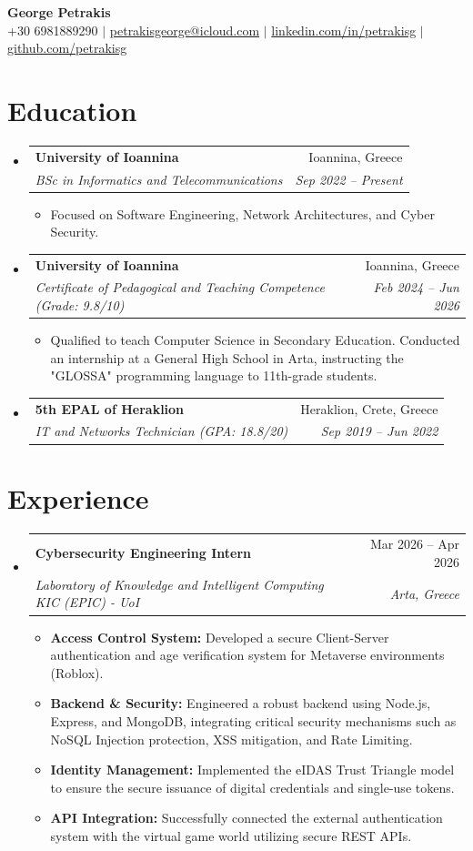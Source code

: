 \documentclass[letterpaper,11pt]{article}
\makeatletter
\newcommand{\resumeItem}[1]{
  \item\small{
    {#1 \vspace{-2pt}}
  }
}
\newcommand{\resumeSubheading}[4]{
  \vspace{-2pt}\item
    \begin{tabular*}{0.97\textwidth}[t]{l@{\extracolsep{\fill}}r}
      \textbf{#1} & #2 \\
      \textit{\small#3} & \textit{\small #4} \\
    \end{tabular*}\vspace{-7pt}
}
\newcommand{\resumeSubHeadingListStart}{\begin{itemize}[leftmargin=0.15in, label={}]}
\newcommand{\resumeSubHeadingListEnd}{\end{itemize}}
\newcommand{\resumeItemListStart}{\begin{itemize}}
\newcommand{\resumeItemListEnd}{\end{itemize}\vspace{-7pt}}
\makeatother
\begin{document}
\begin{center}
    {\Huge \textbf{George Petrakis}} \\ \vspace{2pt}
    \small +30 6981889290 $|$ \href{mailto:petrakisgeorge@icloud.com}{petrakisgeorge@icloud.com} $|$ \href{https://linkedin.com/in/petrakisg}{linkedin.com/in/petrakisg} $|$ \href{https://github.com/petrakisg}{github.com/petrakisg} \\
\end{center}

\section{Education}
  \resumeSubHeadingListStart
    \resumeSubheading
      {University of Ioannina}{Ioannina, Greece}
      {BSc in Informatics and Telecommunications}{Sep 2022 -- Present}
      \resumeItemListStart
        \resumeItem{Focused on Software Engineering, Network Architectures, and Cyber Security.}
      \resumeItemListEnd
    \resumeSubheading
      {University of Ioannina}{Ioannina, Greece}
      {Certificate of Pedagogical and Teaching Competence (Grade: 9.8/10)}{Feb 2024 -- Jun 2026}
      \resumeItemListStart
        \resumeItem{Qualified to teach Computer Science in Secondary Education. Conducted an internship at a General High School in Arta, instructing the "GLOSSA" programming language to 11th-grade students.}
      \resumeItemListEnd
    \resumeSubheading
      {5th EPAL of Heraklion}{Heraklion, Crete, Greece}
      {IT and Networks Technician (GPA: 18.8/20)}{Sep 2019 -- Jun 2022}
  \resumeSubHeadingListEnd

\section{Experience}
  \resumeSubHeadingListStart
    \resumeSubheading
      {Cybersecurity Engineering Intern}{Mar 2026 -- Apr 2026}
      {Laboratory of Knowledge and Intelligent Computing KIC (EPIC) - UoI}{Arta, Greece}
      \resumeItemListStart
        \resumeItem{\textbf{Access Control System:} Developed a secure Client-Server authentication and age verification system for Metaverse environments (Roblox).}
        \resumeItem{\textbf{Backend \& Security:} Engineered a robust backend using Node.js, Express, and MongoDB, integrating critical security mechanisms such as NoSQL Injection protection, XSS mitigation, and Rate Limiting.}
        \resumeItem{\textbf{Identity Management:} Implemented the eIDAS Trust Triangle model to ensure the secure issuance of digital credentials and single-use tokens.}
        \resumeItem{\textbf{API Integration:} Successfully connected the external authentication system with the virtual game world utilizing secure REST APIs.}
      \resumeItemListEnd
  \resumeSubHeadingListEnd
\end{document}

